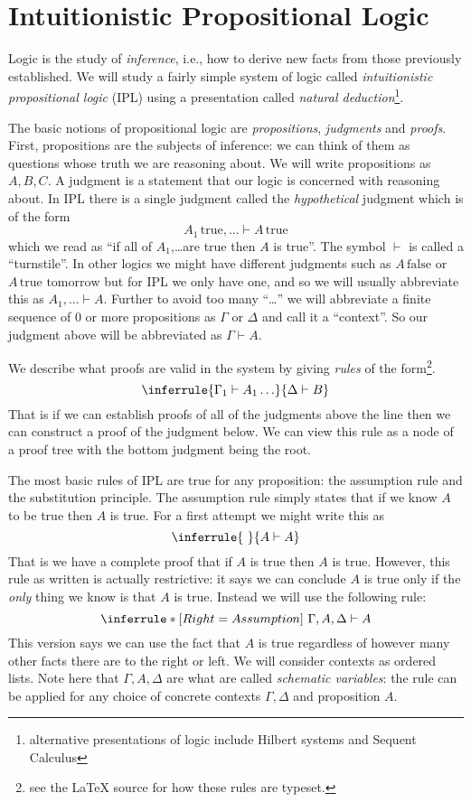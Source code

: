 \documentclass[12pt]{article}
\begin{document}
\section{Intuitionistic Propositional Logic}
\newcommand{\istrue}{\,\textrm{true}}
\newcommand{\isfalse}{\,\textrm{false}}
\newcommand{\istruetomorrow}{\,\textrm{true tomorrow}}

Logic is the study of \emph{inference}, i.e., how to derive new facts
from those previously established. We will study a fairly simple
system of logic called \emph{intuitionistic propositional logic} (IPL)
using a presentation called \emph{natural
deduction}\footnote{alternative presentations of logic include Hilbert
systems and Sequent Calculus}.

The basic notions of propositional logic are \emph{propositions},
\emph{judgments} and \emph{proofs}.  First, propositions are the
subjects of inference: we can think of them as questions whose truth
we are reasoning about. We will write propositions as $A, B, C$. A
judgment is a statement that our logic is concerned with reasoning
about. In IPL there is a single judgment called the
\emph{hypothetical} judgment which is of the form
\[ A_1 \istrue,\ldots \vdash A \istrue \]
which we read as ``if all of $A_1$,\ldots are true then $A$ is
true''. The symbol $\vdash$ is called a ``turnstile''. In other logics
we might have different judgments such as $A \isfalse$ or $A
\istruetomorrow$ but for IPL we only have one, and so we will usually
abbreviate this as $A_1,\ldots \vdash A$. Further to avoid too many
``\ldots'' we will abbreviate a finite sequence of 0 or more
propositions as $\Gamma$ or $\Delta$ and call it a ``context''. So our
judgment above will be abbreviated as $\Gamma \vdash A$.

We describe what proofs are valid in the system by giving \emph{rules}
of the form\footnote{see the LaTeX source for how these rules are
typeset.}.
\[ \inferrule{\Gamma_1 \vdash A_1 \ldots}{\Delta \vdash B}\]
That is if we can establish proofs of all of the judgments above the
line then we can construct a proof of the judgment below. We can view
this rule as a node of a proof tree with the bottom judgment being the
root.

The most basic rules of IPL are true for any proposition: the
assumption rule and the substitution principle. The assumption rule
simply states that if we know $A$ to be true then $A$ is true. For a
first attempt we might write this as
\[ \inferrule{~}{A \vdash A} \]
That is we have a complete proof that if $A$ is true then $A$ is true.
However, this rule as written is actually restrictive: it says we can
conclude $A$ is true only if the \emph{only} thing we know is that $A$
is true. Instead we will use the following rule:
\[ \inferrule*[Right=Assumption]{~}{\Gamma , A, \Delta \vdash A} \]
This version says we can use the fact that $A$ is true regardless of
however many other facts there are to the right or left. We will
consider contexts as ordered lists.
Note here that $\Gamma, A, \Delta$ are what are called \emph{schematic
variables}: the rule can be applied for any choice of concrete
contexts $\Gamma, \Delta$ and proposition $A$.
\end{document}
